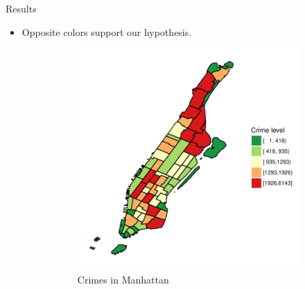 \documentclass[10pt,ignorenonframetext,]{beamer}
\providecommand{\tightlist}{%
  \setlength{\itemsep}{0pt}\setlength{\parskip}{0pt}}
\begin{document}
\begin{frame}{%
\protect\hypertarget{results}{%
Results}}

\begin{itemize}
\tightlist
\item
  Opposite colors support our hypothesis.

  \begin{figure}
  \label{fig:zones}
    \centering
    \begin{subfigure}[t]{0.45\textwidth}
        \centering
        \label{fig:zones_shape}
        \includegraphics[width=1\textwidth]{../img/crimes_per_zone_2015_Manhattan}
        \caption{Crimes in Manhattan}
    \end{subfigure}%
    ~ 
    \begin{subfigure}[t]{0.45\textwidth}
        \centering
        \label{fig:zones_raster}

\end{subfigure}
\end{figure}
\end{itemize}
\end{frame}
\end{document}
